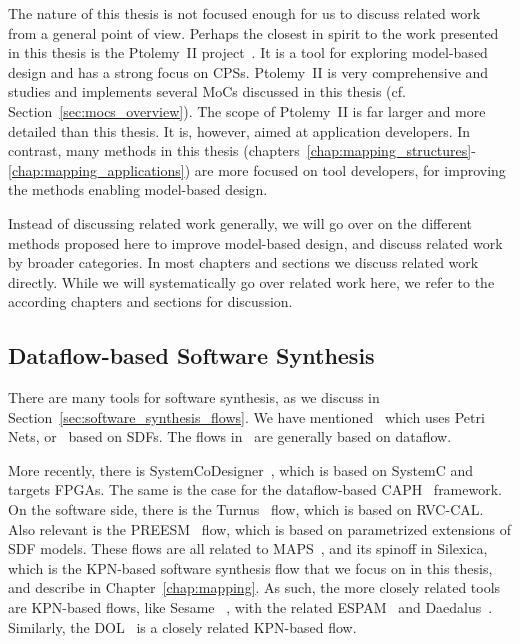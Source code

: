 The nature of this thesis is not focused enough for us to discuss related work from a general point of view.
Perhaps the closest in spirit to the work presented in this thesis is the Ptolemy~II project~\cite{Ptolemaeus:14:SystemDesign}.
It is a tool for exploring model-based design and has a strong focus on \acp{CPS}.
Ptolemy~II is very comprehensive and studies and implements several \acp{MoC} discussed in this thesis (cf. Section~\ref{sec:mocs_overview}).
The scope of Ptolemy~II is far larger and more detailed than this thesis.
It is, however, aimed at application developers.
In contrast, many methods in this thesis (chapters~\ref{chap:mapping_structures}-\ref{chap:mapping_applications}) are more focused on tool developers, for improving the methods enabling model-based design.

Instead of discussing related work generally, we will go over on the different methods proposed here to improve model-based design, and discuss related work by broader categories.
In most chapters and sections we discuss related work directly.
While we will systematically go over related work here, we refer to the according chapters and sections for discussion.

\subsection{Dataflow-based Software Synthesis}

There are many tools for software synthesis, as we discuss in Section~\ref{sec:software_synthesis_flows}.
We have mentioned~\cite{lin1998softwaresynthesis} which uses Petri Nets, or~\cite{ritz1992softwaresynthesis} based on \acp{SDF}.
The flows in~\cite{bhartacharyya2000softwaresynthesis,pino1995softwaresynthesis,bhattacharyya2012softwaresynthesis} are generally based on dataflow.

More recently, there is SystemCoDesigner~\cite{haubelt2008systemcodesigner}, which is based on SystemC and targets \acp{FPGA}.
The same is the case for the dataflow-based CAPH~\cite{serot2013caph}  framework.
On the software side, there is the Turnus~\cite{casale2013turnus} flow, which is based on \ac{RVC}-CAL.
Also relevant is the PREESM~\cite{pelcat2014preesm} flow, which is based on parametrized extensions of \ac{SDF} models.
These flows are all related to \ac{MAPS}~\cite{maps}, and its spinoff in Silexica,
which is the \ac{KPN}-based software synthesis flow that we focus on in this thesis, and describe in Chapter~\ref{chap:mapping}.
As such, the more closely related tools are \ac{KPN}-based flows, like Sesame ~\cite{sesame}, with the related ESPAM~\cite{stefanov2006multi} and Daedalus~\cite{nikolov2008daedalus}. 
Similarly, the \ac{DOL}~\cite{thiele2007DOL} is a closely related \ac{KPN}-based flow.

